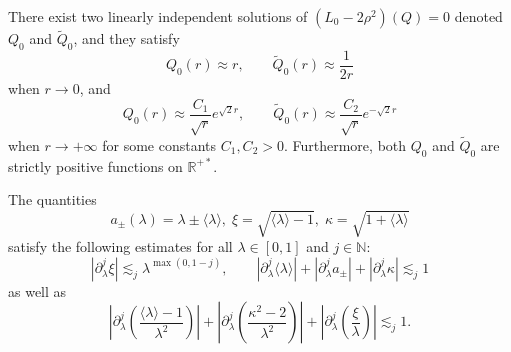 \documentclass[10pt,a4paper]{amsart}
\begin{document}
\begin{lem}
  \label{lethargy}There exist two linearly independent solutions of $(L_0 - 2
  \rho^2) (Q) = 0$ denoted $Q_0$ and $\widetilde{Q}_0$, and they satisfy
  \[ Q_0 (r) \approx r,\qquad \widetilde{Q}_0 (r) \approx \frac{1}{2 r} \]
  when $r \rightarrow 0$, and
  \[ Q_0 (r) \approx \frac{C_1}{\sqrt{r}} e^{\sqrt{2} r},\qquad \widetilde{Q}_0 (r)
     \approx \frac{C_2}{\sqrt{r}} e^{- \sqrt{2} r} \]
  \[ \  \]
  when $r \rightarrow + \infty$ for some constants $C_1, C_2 > 0$.
  Furthermore, both $Q_0$ and $\widetilde{Q}_0$ are strictly positive functions on
  $\mathbb{R}^{+ \ast}$.
\end{lem}

\begin{lem}
  \label{kast}The quantities
  \[ a_{\pm} (\lambda) = \lambda \pm \langle \lambda \rangle, \; \xi =
     \sqrt{\langle \lambda \rangle - 1}, \; \kappa = \sqrt{1 + \langle \lambda
     \rangle} \]
  satisfy the following estimates for all $\lambda \in [0, 1]$ and $j \in \mathbb{N}$:
$$
| \partial_{\lambda}^j \xi | \lesssim_j \lambda^{\max (0, 1 - j)},
\qquad  | \partial_{\lambda}^j \langle \lambda \rangle | + | \partial_{\lambda}^j a_{\pm} | + | \partial_{\lambda}^j \kappa | \lesssim_j 1
$$
as well as
  \[ \left| \partial_{\lambda}^j \left( \frac{\langle \lambda \rangle -
     1}{\lambda^2} \right) \right| + \left| \partial_{\lambda}^j \left(
     \frac{\kappa^2 - 2}{\lambda^2} \right) \right| + \left|
     \partial_{\lambda}^j \left( \frac{\xi}{\lambda} \right) \right|
     \lesssim_j 1. \]
\end{lem}
\end{document}

